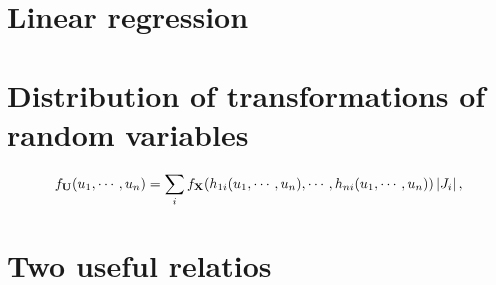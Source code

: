 \documentclass[12pt]{article}
\begin{document}
\section{Linear regression}

\appendix

  \section{Distribution of transformations of random variables}
  \label{tf}

    \begin{equation}
      f_{{\bf U}}(u_1,\cdots,u_n)=\sum_{i}f_{{\bf X}}
                 (h_{1i}(u_1,\cdots,u_n),\cdots,h_{ni}(u_1,\cdots,u_n))\left|J_i\right|,
    \end{equation}

  \section{Two useful relatios}

\begin{thebibliography}{99}
\end{thebibliography}
\end{document}
